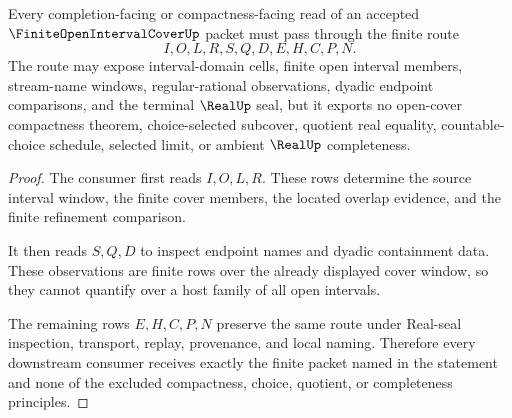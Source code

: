 \begin{theorem}
\label{thm:finite-open-interval-cover-up-constructive-boundary}
Every completion-facing or compactness-facing read of an accepted $\FiniteOpenIntervalCoverUp$ packet must pass through the finite route
$$
I,O,L,R,S,Q,D,E,H,C,P,N .
$$
The route may expose interval-domain cells, finite open interval members, stream-name windows, regular-rational observations, dyadic endpoint comparisons, and the terminal $\RealUp$ seal, but it exports no open-cover compactness theorem, choice-selected subcover, quotient real equality, countable-choice schedule, selected limit, or ambient $\RealUp$ completeness.
\end{theorem}
\begin{proof}
The consumer first reads $I,O,L,R$. These rows determine the source interval window, the finite cover members, the located overlap evidence, and the finite refinement comparison.

It then reads $S,Q,D$ to inspect endpoint names and dyadic containment data. These observations are finite rows over the already displayed cover window, so they cannot quantify over a host family of all open intervals.

The remaining rows $E,H,C,P,N$ preserve the same route under Real-seal inspection, transport, replay, provenance, and local naming. Therefore every downstream consumer receives exactly the finite packet named in the statement and none of the excluded compactness, choice, quotient, or completeness principles.
\end{proof}


\begin{closurestatus}{\FiniteOpenIntervalCoverUp}
  \theoryclosure{\seedClosure}
  \formalstatus{\unformalizedV}
\end{closurestatus}
